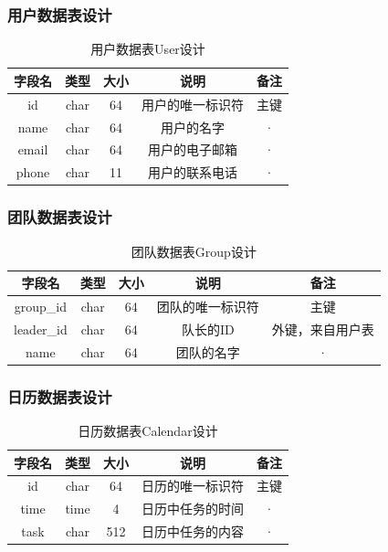 \subsubsection{用户数据表设计}
\begin{table}[htbp]
\centering
\caption{用户数据表User设计} \label{tab:client-database}
\begin{tabular}{|c|c|c|c|c|}
    \hline
    字段名 & 类型 & 大小 & 说明 & 备注 \\
    \hline
    id & char & 64 & 用户的唯一标识符 & 主键\\
    \hline
    name & char & 64 & 用户的名字 & · \\
    \hline
    email & char  & 64 & 用户的电子邮箱 & · \\
    \hline
    phone & char & 11 & 用户的联系电话 & · \\
    \hline
\end{tabular}
\end{table}
\newpage
\subsubsection{团队数据表设计}
\begin{table}[htbp]
\centering
\caption{团队数据表Group设计} \label{tab:order-database}
\begin{tabular}{|c|c|c|c|c|}
    \hline
    字段名 & 类型 & 大小 & 说明 & 备注 \\
    \hline
    group\_id & char & 64 & 团队的唯一标识符 & 主键\\
    \hline
    leader\_id & char & 64 & 队长的ID & 外键，来自用户表 \\
    \hline
    name & char & 64 & 团队的名字 & · \\
    \hline
\end{tabular}
\end{table}
\subsubsection{日历数据表设计}
\begin{table}[htbp]
\centering
\caption{日历数据表Calendar设计} \label{tab:order-database}
\begin{tabular}{|c|c|c|c|c|}
    \hline
    字段名 & 类型 & 大小 & 说明 & 备注 \\
    \hline
    id & char & 64 & 日历的唯一标识符 & 主键\\
    \hline
    time & time & 4 & 日历中任务的时间 & · \\
    \hline
    task & char & 512 & 日历中任务的内容 & · \\
    \hline
\end{tabular}
\end{table}
